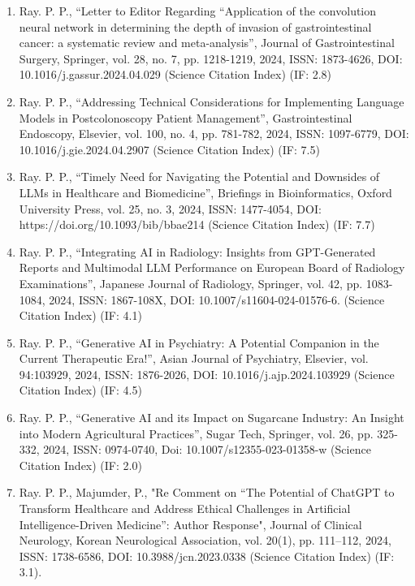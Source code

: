 \documentclass[11pt,a4paper]{moderncv}
\begin{document}
\begin{adjustwidth}{6em}{0pt}
\begin{enumerate}
		\item Ray. P. P., “Letter to Editor Regarding “Application of the convolution neural network in determining the depth of invasion of gastrointestinal cancer: a systematic review and meta-analysis”, Journal of Gastrointestinal Surgery, Springer, vol. 28, no. 7, pp. 1218-1219, 2024, ISSN: 1873-4626, DOI: 10.1016/j.gassur.2024.04.029 (Science Citation Index) (IF: 2.8)
		
		\item Ray. P. P., “Addressing Technical Considerations for Implementing Language Models in Postcolonoscopy Patient Management”, Gastrointestinal Endoscopy, Elsevier, vol. 100, no. 4, pp. 781-782, 2024, ISSN: 1097-6779, DOI: 10.1016/j.gie.2024.04.2907 (Science Citation Index) (IF: 7.5)
		
		\item Ray. P. P., “Timely Need for Navigating the Potential and Downsides of LLMs in Healthcare and Biomedicine”, Briefings in Bioinformatics, Oxford University Press, vol. 25, no. 3, 2024, ISSN: 1477-4054, DOI: https://doi.org/10.1093/bib/bbae214 (Science Citation Index) (IF: 7.7)
		
		\item Ray. P. P., “Integrating AI in Radiology: Insights from GPT-Generated Reports and Multimodal LLM Performance on European Board of Radiology Examinations”, Japanese Journal of Radiology, Springer, vol. 42, pp. 1083-1084, 2024, ISSN: 1867-108X, DOI: 10.1007/s11604-024-01576-6. (Science Citation Index) (IF: 4.1)
		
		\item Ray. P. P., “Generative AI in Psychiatry: A Potential Companion in the Current Therapeutic Era!”, Asian Journal of Psychiatry, Elsevier, vol. 94:103929, 2024, ISSN: 1876-2026, DOI: 10.1016/j.ajp.2024.103929 (Science Citation Index) (IF: 4.5)
		
		\item Ray. P. P., “Generative AI and its Impact on Sugarcane Industry: An Insight into Modern Agricultural Practices”, Sugar Tech, Springer, vol. 26, pp. 325-332, 2024, ISSN: 0974-0740, Doi: 10.1007/s12355-023-01358-w (Science Citation Index) (IF: 2.0)
		
		\item Ray. P. P., Majumder, P., "Re Comment on “The Potential of ChatGPT to Transform Healthcare and Address Ethical Challenges in Artificial Intelligence-Driven Medicine”: Author Response", Journal of Clinical Neurology, Korean Neurological Association, vol. 20(1), pp. 111–112, 2024, ISSN: 1738-6586, DOI: 10.3988/jcn.2023.0338 (Science Citation Index) (IF: 3.1). 
		

\end{enumerate}
\end{adjustwidth}
\end{document}
